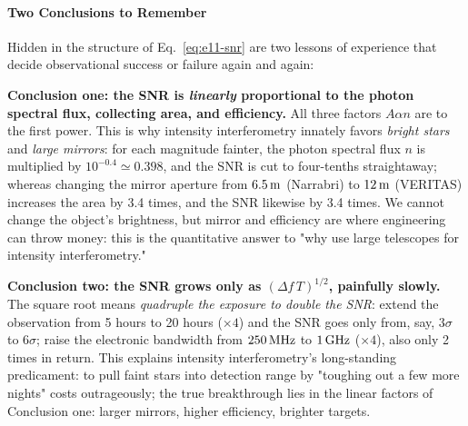 \paragraph{Two Conclusions to Remember}
\label{sec:e11-snr-lessons}

Hidden in the structure of Eq.~\eqref{eq:e11-snr} are two lessons of experience that decide observational success or failure again and again:

\textbf{Conclusion one: the SNR is \emph{linearly} proportional to the photon spectral flux, collecting area, and efficiency.} All three factors \(A\alpha n\) are to the first power. This is why intensity interferometry innately favors \emph{bright stars} and \emph{large mirrors}: for each magnitude fainter, the photon spectral flux \(n\) is multiplied by \(10^{-0.4}\simeq0.398\), and the SNR is cut to four-tenths straightaway; whereas changing the mirror aperture from \(6.5\,{\rm m}\) (Narrabri) to \(12\,{\rm m}\) (VERITAS) increases the area by 3.4 times, and the SNR likewise by 3.4 times. We cannot change the object's brightness, but mirror and efficiency are where engineering can throw money: this is the quantitative answer to "why use large telescopes for intensity interferometry."

\textbf{Conclusion two: the SNR grows only as \((\Delta f\,T)^{1/2}\), painfully slowly.} The square root means \emph{quadruple the exposure to double the SNR}: extend the observation from 5 hours to 20 hours (\(\times4\)) and the SNR goes only from, say, \(3\sigma\) to \(6\sigma\); raise the electronic bandwidth from \(250\,{\rm MHz}\) to \(1\,{\rm GHz}\) (\(\times4\)), also only 2 times in return. This explains intensity interferometry's long-standing predicament: to pull faint stars into detection range by "toughing out a few more nights" costs outrageously; the true breakthrough lies in the linear factors of Conclusion one: larger mirrors, higher efficiency, brighter targets.

